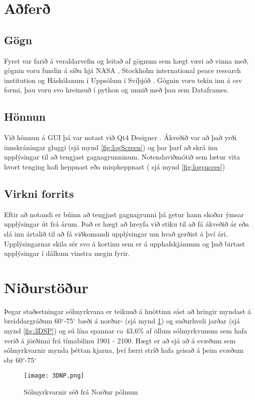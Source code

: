\documentclass[12pt, git, final]{rureport}
\begin{document}
\section{Aðferð}
\subsection{Gögn}
Fyrst var farið á veraldarvefin og leitað af gögnum sem hægt væri að vinna með, gögnin voru fundin á síðu hjá NASA \cite{Eclipse}, Stockholm international peace research institution \cite{weapon} og Háskólanum í Uppsölum í Svíþjóð \cite{conflict}. Gögnin voru tekin inn á csv formi, þau voru svo hreinsuð í python og unnið með þau sem Dataframes.
\subsection{Hönnun}
Við hönnun á GUI þá var notast við Qt4 Designer \cite{qt4}. Ákveðið var að það yrði innskráningar gluggi (sjá mynd \ref{fig:logScreen}) og þar þarf að skrá inn upplýsingar til að tengjast gagnagrunninum. Notendaviðmótið sem lætur vita hvort tenging hafi heppnast eða mispheppnast ( sjá mynd \ref{fig:logsucces}) 


\subsection{Virkni forrits}
Eftir að notandi er búinn að tengjast gagnagrunni þá getur hann skoðar ýmsar upplýsingar út frá árum. Það er hægt að hreyfa við stiku til að fá ákveðið ár eða slá inn ártalið til að fá viðkomandi upplýsingar um hvað gerðist á því ári. Upplýsingarnar skila sér svo á kortinu sem er á upphafskjánnum og það birtast upplýsingar í dálkum vinstra megin fyrir. 


\section{Niðurstöður}\label{nidurstodur}

Þegar staðsetningar sólmyrkvana er teiknuð á hnöttinn sást að hringir myndast á breiddargráðum 60$^{\circ}$-75$^{\circ}$ bæði á norður- (sjá mynd \ref{fig:3DNP}) og suðurhveli jarðar (sjá mynd \ref{fig:3DSP}) og sú lína spannar ca 43,6\% af öllum sólmyrkvunum sem hafa verið á jörðinni frá tímabilinu 1901 - 2100. Hægt er að sjá að á svæðum sem sólmyrkvarnir mynda þéttan kjarna, því færri stríð hafa geisað á þeim svæðum sbr 60$^{\circ}$-75$^{\circ}$
\pagebreak

\begin{figure}
	\centering
	\texttt{[image: 3DNP.png]}
	\caption{Sólmyrkvarnir séð frá Norður pólnum}
	\label{fig:3DNP}
\end{figure}
\end{document}
